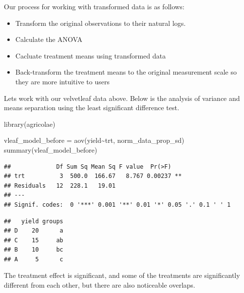 \documentclass[
]{book}
\newenvironment{Shaded}{\begin{snugshade}}{\end{snugshade}}
\newcommand{\FunctionTok}[1]{\textcolor[rgb]{0.00,0.00,0.00}{#1}}
\newcommand{\NormalTok}[1]{#1}
\newcommand{\OtherTok}[1]{\textcolor[rgb]{0.56,0.35,0.01}{#1}}
\newcommand{\SpecialCharTok}[1]{\textcolor[rgb]{0.00,0.00,0.00}{#1}}
\newcommand{\StringTok}[1]{\textcolor[rgb]{0.31,0.60,0.02}{#1}}
\providecommand{\tightlist}{%
  \setlength{\itemsep}{0pt}\setlength{\parskip}{0pt}}
\begin{document}
Our process for working with transformed data is as follows:

\begin{itemize}
\tightlist
\item
  Transform the original observations to their natural logs.\\
\item
  Calculate the ANOVA
\item
  Cacluate treatment means using transformed data
\item
  Back-transform the treatment means to the original measurement scale so they are more intuitive to users
\end{itemize}

Lets work with our velvetleaf data above. Below is the analysis of variance and means separation using the least significant difference test.

\begin{Shaded}
\begin{Highlighting}[]
\FunctionTok{library}\NormalTok{(agricolae)}

\NormalTok{vleaf\_model\_before }\OtherTok{=} \FunctionTok{aov}\NormalTok{(yield}\SpecialCharTok{\textasciitilde{}}\NormalTok{trt, norm\_data\_prop\_sd)}
\FunctionTok{summary}\NormalTok{(vleaf\_model\_before)}
\end{Highlighting}
\end{Shaded}

\begin{verbatim}
##             Df Sum Sq Mean Sq F value  Pr(>F)   
## trt          3  500.0  166.67   8.767 0.00237 **
## Residuals   12  228.1   19.01                   
## ---
## Signif. codes:  0 '***' 0.001 '**' 0.01 '*' 0.05 '.' 0.1 ' ' 1
\end{verbatim}

\begin{Shaded}
\end{Shaded}

\begin{verbatim}
##   yield groups
## D    20      a
## C    15     ab
## B    10     bc
## A     5      c
\end{verbatim}

The treatment effect is significant, and some of the treatments are significantly different from each other, but there are also noticeable overlaps.
\end{document}
